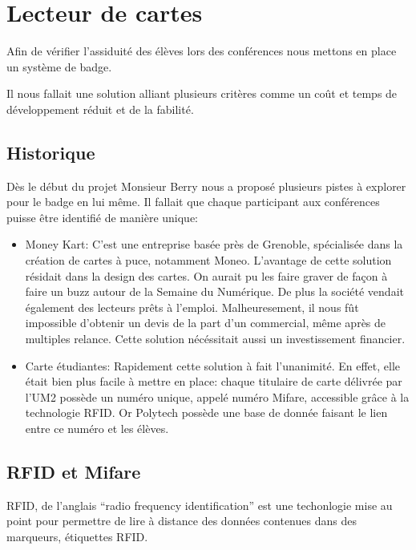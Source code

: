\chapter{Lecteur de cartes}
Afin de vérifier l'assiduité des élèves lors des conférences nous mettons en
place un système de badge.

Il nous fallait une solution alliant plusieurs critères comme un coût et temps
de développement réduit et de la fabilité.

\newpage

\section{Historique}
Dès le début du projet Monsieur Berry nous a proposé plusieurs pistes à 
explorer pour le badge en lui même. Il fallait que chaque participant aux
conférences puisse être identifié de manière unique:

\begin{itemize}
\item Money Kart: C'est une entreprise basée près de Grenoble, spécialisée
dans la création de cartes à puce, notamment Moneo. L'avantage de cette solution
résidait dans la design des cartes. On aurait pu les faire graver
de façon à faire un buzz autour de la Semaine du Numérique. De plus la société
vendait également des lecteurs prêts à l'emploi.
Malheuresement, il nous fût impossible d'obtenir un devis de la part d'un
commercial, même après de multiples relance. Cette solution nécéssitait aussi
un investissement financier.

\item Carte étudiantes: Rapidement cette solution à fait l'unanimité. En effet,
elle était bien plus facile à mettre en place: chaque titulaire de carte délivrée
par l'UM2 possède un numéro unique, appelé numéro Mifare, accessible grâce à
la technologie RFID. Or Polytech possède une base de donnée faisant le lien entre
ce numéro et les élèves.
\end{itemize}

\section{RFID et Mifare}
RFID, de l'anglais ``radio frequency identification'' est une techonlogie 
mise au point pour permettre de lire à distance des données contenues dans des
marqueurs, étiquettes RFID.

